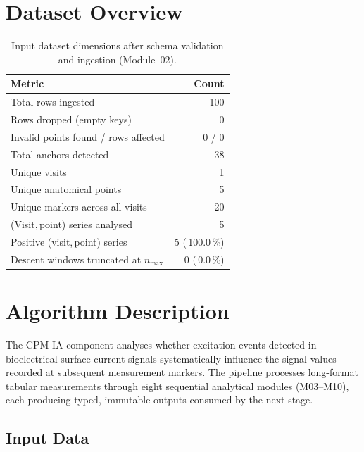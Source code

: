 \documentclass[a4paper,11pt]{article}
\begin{document}
\section{Dataset Overview}

\begin{table}[h!]
\centering
\small
\caption{Input dataset dimensions after schema validation and ingestion (Module~02).}
\begin{tabular}{lr}
\toprule
\textbf{Metric} & \textbf{Count} \\
\midrule
Total rows ingested                        & 100 \\
Rows dropped (empty keys)                  & 0 \\
Invalid points found / rows affected       & 0 / 0 \\
Total anchors detected                     & 38 \\
Unique visits                          & 1 \\
Unique anatomical points               & 5 \\
Unique markers across all visits       & 20 \\
(Visit,\,point) series analysed        & 5 \\
Positive (visit,\,point) series        & 5 (\,100.0\,\%) \\
Descent windows truncated at $n_{\max}$ & 0 (\,0.0\,\%) \\
\bottomrule
\end{tabular}
\end{table}

\section{Algorithm Description}

The CPM-IA component analyses whether excitation events detected in bioelectrical surface
current signals systematically influence the signal values recorded at subsequent measurement
markers. The pipeline processes long-format tabular measurements through eight sequential
analytical modules (M03--M10), each producing typed, immutable outputs consumed by the next
stage.

\subsection{Input Data}
\end{document}
